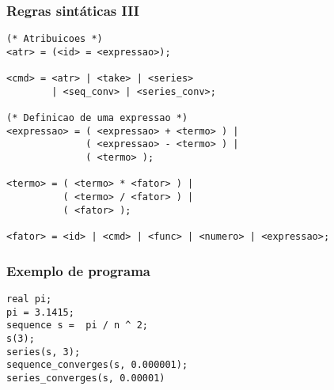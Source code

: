 \documentclass{beamer}
\begin{document}
\begin{frame}[fragile]
\frametitle{Regras sint\'aticas III}
\begin{verbatim}
(* Atribuicoes *)
<atr> = (<id> = <expressao>);

<cmd> = <atr> | <take> | <series>
        | <seq_conv> | <series_conv>;

(* Definicao de uma expressao *)
<expressao> = ( <expressao> + <termo> ) |
              ( <expressao> - <termo> ) |
              ( <termo> );

<termo> = ( <termo> * <fator> ) |
          ( <termo> / <fator> ) |
          ( <fator> );

<fator> = <id> | <cmd> | <func> | <numero> | <expressao>;
\end{verbatim}
\end{frame}

\begin{frame}[fragile]
\frametitle{Exemplo de programa}
\begin{verbatim}
real pi;
pi = 3.1415;
sequence s =  pi / n ^ 2;
s(3);
series(s, 3);
sequence_converges(s, 0.000001);
series_converges(s, 0.00001)
\end{verbatim}
\end{frame}
\end{document}

